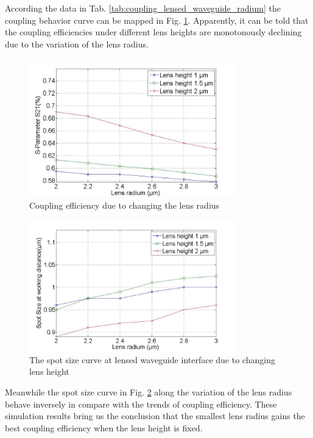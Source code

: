 According the data in Tab. \ref{tab:coupling_lensed_waveguide_radium} the coupling behavior curve can be mapped in Fig. \ref{fig:coupling_lenses_curve_rxx}. Apparently, it can be told that the coupling efficiencies under different lens heights are monotonously declining due to the variation of the lens radius.
\begin{figure}[!ht]
\centering
\includegraphics[width=0.8\textwidth]{bilder/s21_fix_lens_height_rxx}
\caption{Coupling efficiency due to changing the lens radius}
\label{fig:coupling_lenses_curve_rxx}
\end{figure}
\begin{figure}[!ht]
\centering
\includegraphics[width=0.8\textwidth]{bilder/spot_fix_lens_height_rxx}
\caption{The spot size curve at lensed waveguide interface due to changing lens height}
\label{fig:lensed_guide_spot_size_curve_rxx}
\end{figure}
Meanwhile the spot size curve in Fig. \ref{fig:lensed_guide_spot_size_curve_rxx} along the variation of the lens radius behave inversely in compare with the trends of coupling efficiency. These simulation results bring us the conclusion that the smallest lens radius gains the best coupling efficiency when the lens height is fixed. 

